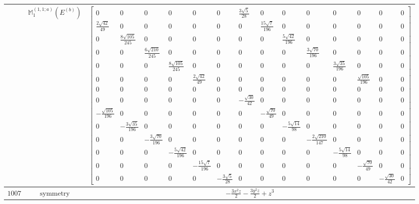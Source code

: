 \documentclass[fleqn,8pt,landscape]{jsarticle}
\begin{document}
\begin{longtable}{ccc}
$  $ & $ \mathbb{M}_{1}^{(1,1;a)}(E^{(b)}) $ & $ \begin{bmatrix} 0 & 0 & 0 & 0 & 0 & 0 & \frac{3 \sqrt{5}}{28} & 0 & 0 & 0 & 0 & 0 & 0 & 0 \\ \frac{2 \sqrt{42}}{49} & 0 & 0 & 0 & 0 & 0 & 0 & \frac{15 \sqrt{7}}{196} & 0 & 0 & 0 & 0 & 0 & 0 \\ 0 & \frac{8 \sqrt{105}}{245} & 0 & 0 & 0 & 0 & 0 & 0 & \frac{5 \sqrt{42}}{196} & 0 & 0 & 0 & 0 & 0 \\ 0 & 0 & \frac{6 \sqrt{210}}{245} & 0 & 0 & 0 & 0 & 0 & 0 & \frac{3 \sqrt{70}}{196} & 0 & 0 & 0 & 0 \\ 0 & 0 & 0 & \frac{8 \sqrt{105}}{245} & 0 & 0 & 0 & 0 & 0 & 0 & \frac{3 \sqrt{35}}{196} & 0 & 0 & 0 \\ 0 & 0 & 0 & 0 & \frac{2 \sqrt{42}}{49} & 0 & 0 & 0 & 0 & 0 & 0 & \frac{\sqrt{105}}{196} & 0 & 0 \\ 0 & 0 & 0 & 0 & 0 & 0 & 0 & 0 & 0 & 0 & 0 & 0 & 0 & 0 \\ 0 & 0 & 0 & 0 & 0 & 0 & - \frac{\sqrt{30}}{42} & 0 & 0 & 0 & 0 & 0 & 0 & 0 \\ - \frac{\sqrt{105}}{196} & 0 & 0 & 0 & 0 & 0 & 0 & - \frac{\sqrt{70}}{49} & 0 & 0 & 0 & 0 & 0 & 0 \\ 0 & - \frac{3 \sqrt{35}}{196} & 0 & 0 & 0 & 0 & 0 & 0 & - \frac{5 \sqrt{14}}{98} & 0 & 0 & 0 & 0 & 0 \\ 0 & 0 & - \frac{3 \sqrt{70}}{196} & 0 & 0 & 0 & 0 & 0 & 0 & - \frac{2 \sqrt{210}}{147} & 0 & 0 & 0 & 0 \\ 0 & 0 & 0 & - \frac{5 \sqrt{42}}{196} & 0 & 0 & 0 & 0 & 0 & 0 & - \frac{5 \sqrt{14}}{98} & 0 & 0 & 0 \\ 0 & 0 & 0 & 0 & - \frac{15 \sqrt{7}}{196} & 0 & 0 & 0 & 0 & 0 & 0 & - \frac{\sqrt{70}}{49} & 0 & 0 \\ 0 & 0 & 0 & 0 & 0 & - \frac{3 \sqrt{5}}{28} & 0 & 0 & 0 & 0 & 0 & 0 & - \frac{\sqrt{30}}{42} & 0 \end{bmatrix} $ \\ \hline
$ 1007 $ & $ \text{symmetry} $ & $ - \frac{3 x^{2} z}{2} - \frac{3 y^{2} z}{2} + z^{3} $ \\

\end{longtable}
\end{document}
